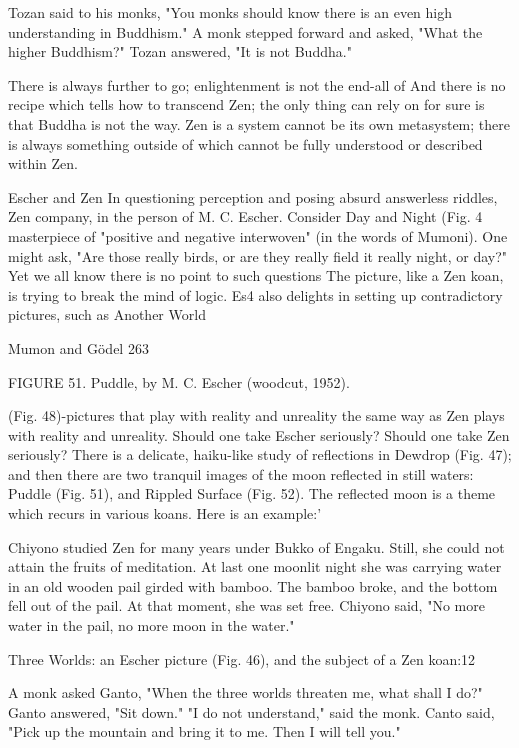    Tozan said to his monks, "You monks should know there is an even high
   understanding in Buddhism." A monk stepped forward and asked, "What the higher
   Buddhism?" Tozan answered, "It is not Buddha."

There is always further to go; enlightenment is not the end-all of And there is no recipe
which tells how to transcend Zen; the only thing can rely on for sure is that Buddha is not
the way. Zen is a system cannot be its own metasystem; there is always something
outside of which cannot be fully understood or described within Zen.

                                   Escher and Zen
In questioning perception and posing absurd answerless riddles, Zen company, in the
person of M. C. Escher. Consider Day and Night (Fig. 4 masterpiece of "positive and
negative interwoven" (in the words of Mumoni). One might ask, "Are those really birds,
or are they really field it really night, or day?" Yet we all know there is no point to such
questions The picture, like a Zen koan, is trying to break the mind of logic. Es4 also
delights in setting up contradictory pictures, such as Another World




Mumon and Gödel                                                                         263

                 FIGURE 51. Puddle, by M. C. Escher (woodcut, 1952).

(Fig. 48)-pictures that play with reality and unreality the same way as Zen plays with
reality and unreality. Should one take Escher seriously? Should one take Zen seriously?
        There is a delicate, haiku-like study of reflections in Dewdrop (Fig. 47); and then
there are two tranquil images of the moon reflected in still waters: Puddle (Fig. 51), and
Rippled Surface (Fig. 52). The reflected moon is a theme which recurs in various koans.
Here is an example:'

   Chiyono studied Zen for many years under Bukko of Engaku. Still, she could not
   attain the fruits of meditation. At last one moonlit night she was carrying water in an
   old wooden pail girded with bamboo. The bamboo broke, and the bottom fell out of
   the pail. At that moment, she was set free. Chiyono said, "No more water in the pail,
   no more moon in the water."

Three Worlds: an Escher picture (Fig. 46), and the subject of a Zen koan:12

   A monk asked Ganto, "When the three worlds threaten me, what shall I do?" Ganto
   answered, "Sit down." "I do not understand," said the monk. Canto said, "Pick up the
   mountain and bring it to me. Then I will tell you."




